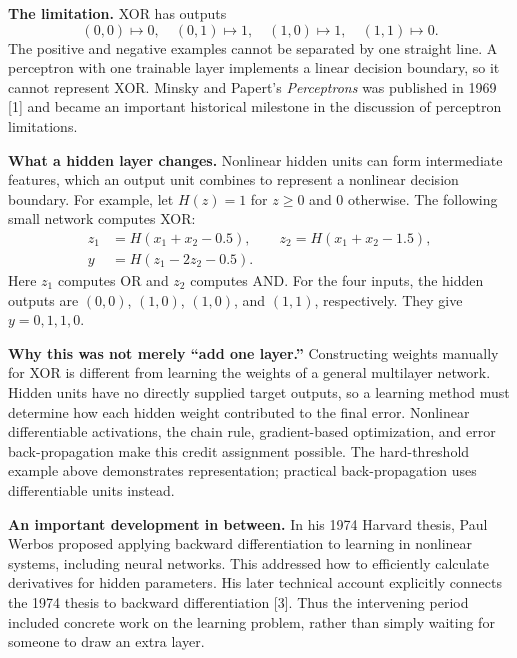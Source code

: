 \documentclass[11pt,a4paper]{article}
\begin{document}
\textbf{The limitation.} XOR has outputs
\[
(0,0)\mapsto0,\quad(0,1)\mapsto1,\quad(1,0)\mapsto1,\quad(1,1)\mapsto0.
\]
The positive and negative examples cannot be separated by one straight line. A perceptron with one trainable layer implements a linear decision boundary, so it cannot represent XOR. Minsky and Papert's \emph{Perceptrons} was published in 1969 [1] and became an important historical milestone in the discussion of perceptron limitations.

\textbf{What a hidden layer changes.} Nonlinear hidden units can form intermediate features, which an output unit combines to represent a nonlinear decision boundary. For example, let $H(z)=1$ for $z\geq0$ and $0$ otherwise. The following small network computes XOR:
\begin{align*}
z_1&=H(x_1+x_2-0.5),\qquad z_2=H(x_1+x_2-1.5),\\
y&=H(z_1-2z_2-0.5).
\end{align*}
Here $z_1$ computes OR and $z_2$ computes AND. For the four inputs, the hidden outputs are $(0,0)$, $(1,0)$, $(1,0)$, and $(1,1)$, respectively. They give $y=0,1,1,0$.

\begin{center}
\end{center}
\textbf{Why this was not merely ``add one layer.''} Constructing weights manually for XOR is different from learning the weights of a general multilayer network. Hidden units have no directly supplied target outputs, so a learning method must determine how each hidden weight contributed to the final error. Nonlinear differentiable activations, the chain rule, gradient-based optimization, and error back-propagation make this credit assignment possible. The hard-threshold example above demonstrates representation; practical back-propagation uses differentiable units instead.

\newpage
\textbf{An important development in between.} In his 1974 Harvard thesis, Paul Werbos proposed applying backward differentiation to learning in nonlinear systems, including neural networks. This addressed how to efficiently calculate derivatives for hidden parameters. His later technical account explicitly connects the 1974 thesis to backward differentiation [3]. Thus the intervening period included concrete work on the learning problem, rather than simply waiting for someone to draw an extra layer.
\end{document}
